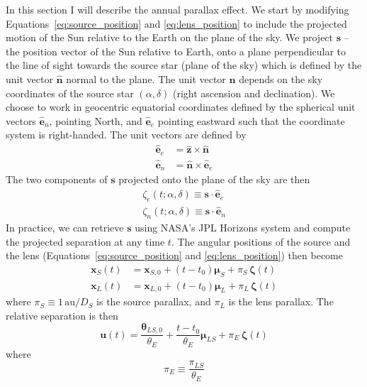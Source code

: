 \documentclass[12pt]{report}
\renewcommand{\vec}[1]{\boldsymbol{\mathbf{#1}}}
\begin{document}
In this section I will describe the annual parallax effect. We start by
modifying Equations~\ref{eq:source_position} and \ref{eq:lens_position} to
include the projected motion of the Sun relative to the Earth on the plane of
the sky. We project $\mathbf s$ -- the position vector of the Sun relative to
Earth, onto a plane perpendicular to the line of sight towards the source star
(plane of the sky) which is defined by the unit vector $\boldsymbol{\hat n}$
normal to the plane. The unit vector $\boldsymbol{\hat n}$ depends on the sky
coordinates of the source star $(\alpha,\delta)$ (right ascension and
declination). We choose to work in geocentric equatorial coordinates defined by
the spherical unit vectors $\hat{\mathbf e}_n$, pointing North, and
$\hat{\mathbf e}_e$ pointing eastward such that the coordinate system is
right-handed. The unit vectors are defined by
\begin{align}
    \hat{\mathbf e}_e & = \hat{\mathbf z}\times \hat{\mathbf n}  \\
    \hat{\mathbf e}_n & = \hat{\mathbf n}\times\hat{\mathbf e}_e
\end{align}
The two components of $\mathbf s$ projected onto the plane of the sky are then
\begin{align}
    \zeta_e(t;\alpha,\delta)\equiv \mathbf s\cdot \hat{\mathbf e}_e \\
    \zeta_n(t;\alpha,\delta)\equiv \mathbf s\cdot \hat{\mathbf e}_n
\end{align}
In practice, we can retrieve $\mathbf{s}$ using NASA's JPL Horizons system and compute
the projected separation at any time $t$.
The angular positions of the source and the lens
(Equations~\ref{eq:source_position} and \ref{eq:lens_position}) then become
\begin{align}
    \vec{x}_S(t) & = \vec{x}_{S,0}+(t-t_0)\boldsymbol{\mu}_S
    +\pi_S\,\boldsymbol{\zeta}(t)                            \\
    \vec{x}_L(t) & = \vec{x}_{L,0}+(t-t_0)\boldsymbol{\mu}_L
    +\pi_L\,\boldsymbol{\zeta}(t)
\end{align}
where  $\pi_S\equiv 1\,\mathrm{au}/D_S$ is the source parallax, and $\pi_L$ is the
lens parallax.
The relative separation is then
\begin{equation}
    \boldsymbol{u}(t)= \frac{\boldsymbol\theta_{LS, 0}}{\theta_E}
    +\frac{t-t_0}{\theta_E}\boldsymbol{\mu}_{LS}+\pi_{E}\,\boldsymbol{\zeta}(t)
    \label{eq:relative_separation_parallax}
\end{equation}
where
\begin{equation}
    \pi_E\equiv \frac{\pi_{LS}}{\theta_E}
    \label{eq:pi_E}
\end{equation}
\end{document}
